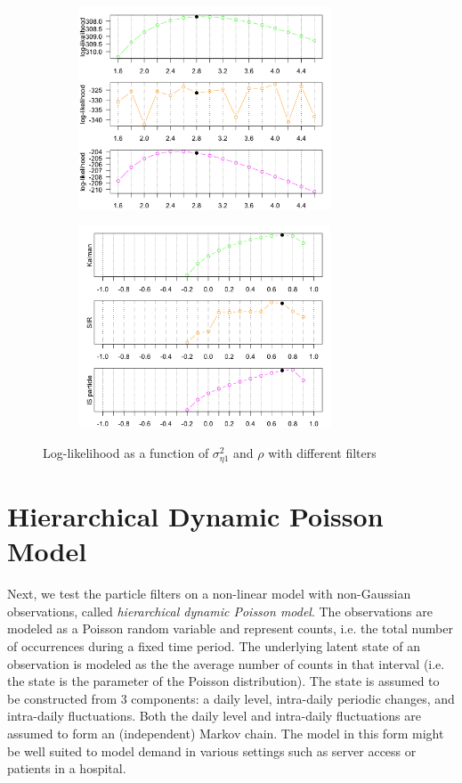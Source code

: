 \documentclass[11pt, oneside]{scrreprt}   	%
\begin{document}
\begin{figure}[h!]
\centering
\begin{subfigure}{.5\textwidth}
  \centering
  \includegraphics[width=75mm]{../../images/mllm-loglik-var2.png}
\end{subfigure}%
\begin{subfigure}{.5\textwidth}
  \centering
  \includegraphics[width=75mm]{../../images/mllm-loglik-rho.png}
\end{subfigure}
\caption{Log-likelihood as a function of $\sigma_{\eta 1}^2$ and $\rho$ with different filters}
\label{fig:mllm_loglik}
\end{figure}


\newpage
\section{Hierarchical Dynamic Poisson Model}
Next, we test the particle filters on a non-linear model with non-Gaussian observations, called \textit{hierarchical dynamic Poisson model}. The observations are modeled as a Poisson random variable and represent counts, i.e. the total number of occurrences during a fixed time period. The underlying latent state of an observation is modeled as the the average number of counts in that interval (i.e. the state is the parameter of the Poisson distribution). The state is assumed to be constructed from 3 components: a daily level, intra-daily periodic changes, and intra-daily fluctuations. Both the daily level and intra-daily fluctuations are assumed to form an (independent) Markov chain. The model in this form might be well suited to model demand in various settings such as server access or patients in a hospital.
\end{document}
